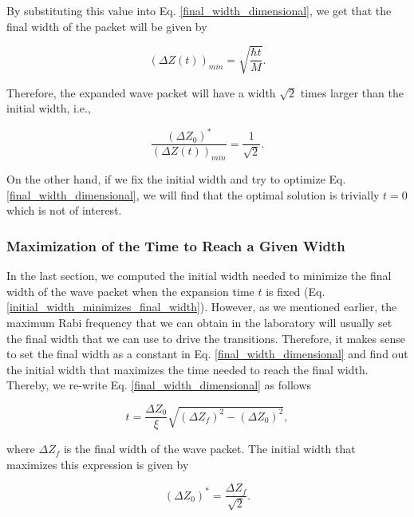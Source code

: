 \documentclass{article}
\begin{document}
By substituting this value into Eq. \ref{final_width_dimensional}, we get that the final width of the packet will be given by

\begin{equation}\label{final_width_minimum}
    (\Delta Z(t))_{min}  = \sqrt{\frac{\hbar t}{M}}.
\end{equation}

Therefore, the expanded wave packet will have a width $\sqrt{2}$ times larger than the initial width, i.e.,

\begin{equation}\label{ration_optimial_initial_width_vs_final_width}
    \frac{(\Delta Z_{0})^{\ast}}{(\Delta Z(t))_{min}} = \frac{1}{\sqrt{2}}.
\end{equation}

On the other hand, if we fix the initial width and try to optimize Eq. \ref{final_width_dimensional}, we will find that the optimal solution is trivially $t=0$ which is not of interest.

\subsubsection{Maximization of the Time to Reach a Given Width}
In the last section, we computed the initial width needed to minimize the final width of the wave packet when the expansion time $t$ is fixed (Eq. \ref{initial_width_minimizes_final_width}). However, as we mentioned earlier, the maximum Rabi frequency that we can obtain in the laboratory will usually set the final width that we can use to drive the transitions. Therefore, it makes sense to set the final width as a constant in Eq. \ref{final_width_dimensional} and find out the initial width that maximizes the time needed to reach the final width. Thereby, we re-write Eq. \ref{final_width_dimensional} as follows

\begin{equation}\label{expansion_wave_packet_time_solution}
    t = \frac{\Delta Z_{0}}{\xi} \sqrt{(\Delta Z_{f})^2 - (\Delta Z_{0})^2},
\end{equation}

where $\Delta Z_{f}$ is the final width of the wave packet. The initial width that maximizes this expression is given by

\begin{equation}\label{ratio_optimial_initial_width_vs_final_width_time_max}
    (\Delta Z_{0})^{\ast} = \frac{\Delta Z_{f}}{\sqrt{2}}.
\end{equation}
\end{document}
